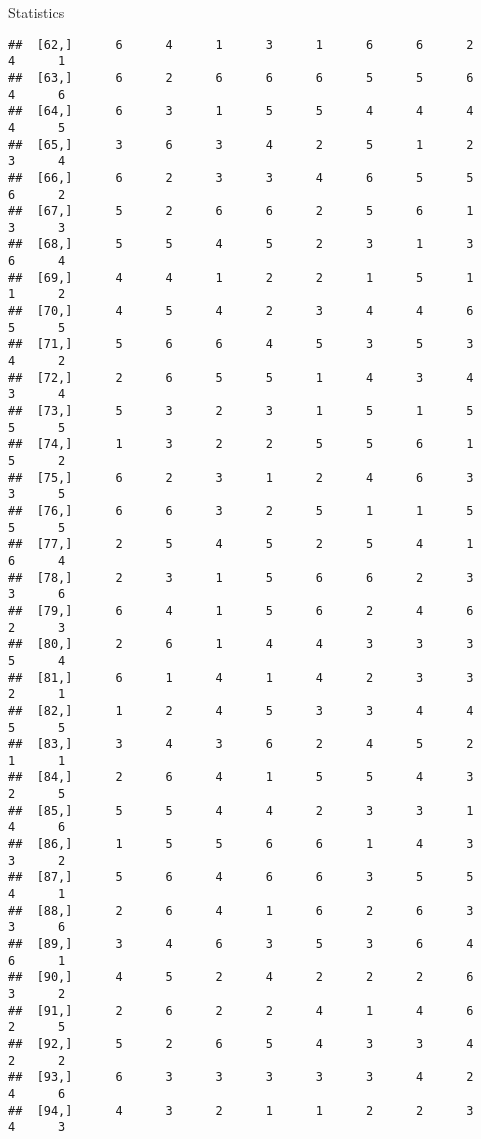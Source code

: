 \documentclass[
  ignorenonframetext,
]{beamer}
\begin{document}
\begin{frame}[fragile]{Statistics}
\begin{verbatim}
##  [62,]      6      4      1      3      1      6      6      2      4      1
##  [63,]      6      2      6      6      6      5      5      6      4      6
##  [64,]      6      3      1      5      5      4      4      4      4      5
##  [65,]      3      6      3      4      2      5      1      2      3      4
##  [66,]      6      2      3      3      4      6      5      5      6      2
##  [67,]      5      2      6      6      2      5      6      1      3      3
##  [68,]      5      5      4      5      2      3      1      3      6      4
##  [69,]      4      4      1      2      2      1      5      1      1      2
##  [70,]      4      5      4      2      3      4      4      6      5      5
##  [71,]      5      6      6      4      5      3      5      3      4      2
##  [72,]      2      6      5      5      1      4      3      4      3      4
##  [73,]      5      3      2      3      1      5      1      5      5      5
##  [74,]      1      3      2      2      5      5      6      1      5      2
##  [75,]      6      2      3      1      2      4      6      3      3      5
##  [76,]      6      6      3      2      5      1      1      5      5      5
##  [77,]      2      5      4      5      2      5      4      1      6      4
##  [78,]      2      3      1      5      6      6      2      3      3      6
##  [79,]      6      4      1      5      6      2      4      6      2      3
##  [80,]      2      6      1      4      4      3      3      3      5      4
##  [81,]      6      1      4      1      4      2      3      3      2      1
##  [82,]      1      2      4      5      3      3      4      4      5      5
##  [83,]      3      4      3      6      2      4      5      2      1      1
##  [84,]      2      6      4      1      5      5      4      3      2      5
##  [85,]      5      5      4      4      2      3      3      1      4      6
##  [86,]      1      5      5      6      6      1      4      3      3      2
##  [87,]      5      6      4      6      6      3      5      5      4      1
##  [88,]      2      6      4      1      6      2      6      3      3      6
##  [89,]      3      4      6      3      5      3      6      4      6      1
##  [90,]      4      5      2      4      2      2      2      6      3      2
##  [91,]      2      6      2      2      4      1      4      6      2      5
##  [92,]      5      2      6      5      4      3      3      4      2      2
##  [93,]      6      3      3      3      3      3      4      2      4      6
##  [94,]      4      3      2      1      1      2      2      3      4      3

\end{verbatim}
\end{frame}
\end{document}
